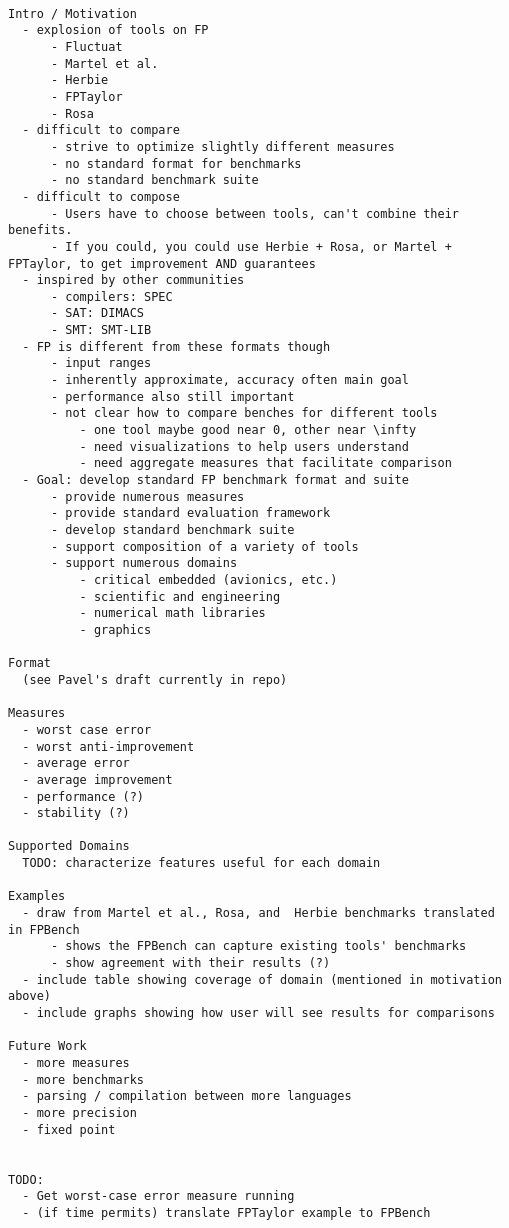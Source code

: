 \begin{verbatim}

Intro / Motivation
  - explosion of tools on FP
      - Fluctuat
      - Martel et al.
      - Herbie
      - FPTaylor
      - Rosa
  - difficult to compare
      - strive to optimize slightly different measures
      - no standard format for benchmarks
      - no standard benchmark suite
  - difficult to compose
      - Users have to choose between tools, can't combine their benefits.
      - If you could, you could use Herbie + Rosa, or Martel + FPTaylor, to get improvement AND guarantees
  - inspired by other communities
      - compilers: SPEC
      - SAT: DIMACS
      - SMT: SMT-LIB
  - FP is different from these formats though
      - input ranges
      - inherently approximate, accuracy often main goal
      - performance also still important
      - not clear how to compare benches for different tools
          - one tool maybe good near 0, other near \infty
          - need visualizations to help users understand
          - need aggregate measures that facilitate comparison
  - Goal: develop standard FP benchmark format and suite
      - provide numerous measures
      - provide standard evaluation framework
      - develop standard benchmark suite
      - support composition of a variety of tools
      - support numerous domains
          - critical embedded (avionics, etc.)
          - scientific and engineering
          - numerical math libraries
          - graphics

Format
  (see Pavel's draft currently in repo)

Measures
  - worst case error
  - worst anti-improvement
  - average error
  - average improvement
  - performance (?)
  - stability (?)

Supported Domains
  TODO: characterize features useful for each domain

Examples
  - draw from Martel et al., Rosa, and  Herbie benchmarks translated in FPBench
      - shows the FPBench can capture existing tools' benchmarks
      - show agreement with their results (?)
  - include table showing coverage of domain (mentioned in motivation above)
  - include graphs showing how user will see results for comparisons

Future Work
  - more measures
  - more benchmarks
  - parsing / compilation between more languages
  - more precision
  - fixed point


TODO:
  - Get worst-case error measure running
  - (if time permits) translate FPTaylor example to FPBench

\end{verbatim}
